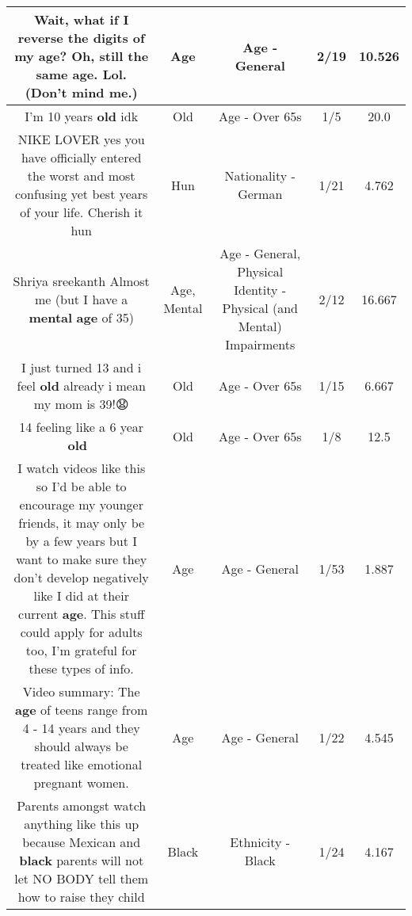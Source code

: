\documentclass[11pt]{article}
\newlength\mylength
\begin{document}
\begin{center}
\begin{longtable}{|C{.65\mylength}|C{.30\mylength}|C{.12\mylength}|C{.12\mylength}|C{.12\mylength}|}
  \small Wait, what if I reverse the digits of my \textbf{age}? Oh, still the same \textbf{age}. Lol. (Don't mind me.)\normalsize   & Age & Age - General & 2/19 & 10.526 \\  \hline
  \small I'm  10 years \textbf{old} idk\normalsize   & Old & Age - Over 65s & 1/5 & 20.0 \\  \hline
  \small NIKE LOVER yes you have officially entered the worst and most confusing yet best years of your life. Cherish it hun\normalsize   & Hun & Nationality - German & 1/21 & 4.762 \\  \hline
  \small Shriya sreekanth Almost me (but I have a \textbf{mental} \textbf{age} of 35)\normalsize   & Age, Mental & Age - General, Physical Identity - Physical (and Mental) Impairments & 2/12 & 16.667 \\  \hline
  \small I just turned 13 and i feel \textbf{old} already i mean my mom is 39!😧\normalsize   & Old & Age - Over 65s & 1/15 & 6.667 \\  \hline
  \small 14 feeling like a 6 year \textbf{old} 🤣\normalsize   & Old & Age - Over 65s & 1/8 & 12.5 \\  \hline
  \small I watch videos like this so I'd be able to encourage my younger friends, it may only be by a few years but I want to make sure they don't develop negatively like I did at their current \textbf{age}. This stuff could apply for adults too, I'm grateful for these types of info.\normalsize   & Age & Age - General & 1/53 & 1.887 \\  \hline
  \small Video summary: The \textbf{age} of teens range from 4 - 14 years and they should always be treated like emotional pregnant women.\normalsize   & Age & Age - General & 1/22 & 4.545 \\  \hline
  \small Parents amongst watch anything like this up because Mexican and \textbf{black} parents will not let NO BODY  tell them how to raise they child\normalsize   & Black & Ethnicity - Black & 1/24 & 4.167 \\  \hline

\end{longtable}
\end{center}
\end{document}
